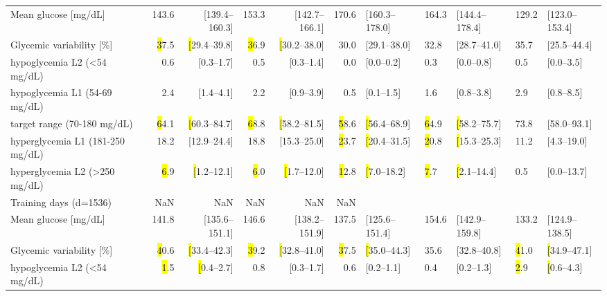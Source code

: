 \begin{tabular}{lrrrrr}
Mean glucose [mg/dL]                         &     143.6 & [139.4--160.3] &     153.3 & [142.7--166.1] &     170.6 & [160.3--178.0] &     164.3 & [144.4--178.4] &     129.2 & [123.0--153.4] \\
Glycemic variability [\%]                    &  \hl37.5 & \hl[29.4--39.8] &  \hl36.9 & \hl[30.2--38.0] &        30.0 & [29.1--38.0] &        32.8 & [28.7--41.0] &        35.7 & [25.5--44.4] \\
\hspace{7mm}hypoglycemia L2 (<54 mg/dL)      &           0.6 & [0.3--1.7] &           0.5 & [0.3--1.4] &           0.0 & [0.0--0.2] &           0.3 & [0.0--0.8] &           0.5 & [0.0--3.5] \\
\hspace{7mm}hypoglycemia L1 (54-69 mg/dL)    &           2.4 & [1.4--4.1] &           2.2 & [0.9--3.9] &           0.5 & [0.1--1.5] &           1.6 & [0.8--3.8] &           2.9 & [0.8--8.5] \\
\hspace{7mm}target range (70-180 mg/dL)      &  \hl64.1 & \hl[60.3--84.7] &  \hl68.8 & \hl[58.2--81.5] &  \hl58.6 & \hl[56.4--68.9] &  \hl64.9 & \hl[58.2--75.7] &        73.8 & [58.0--93.1] \\
\hspace{7mm}hyperglycemia L1 (181-250 mg/dL) &        18.2 & [12.9--24.4] &        18.8 & [15.3--25.0] &  \hl23.7 & \hl[20.4--31.5] &  \hl20.8 & \hl[15.3--25.3] &         11.2 & [4.3--19.0] \\
\hspace{7mm}hyperglycemia L2 (>250 mg/dL)    &    \hl6.9 & \hl[1.2--12.1] &    \hl6.0 & \hl[1.7--12.0] &   \hl12.8 & \hl[7.0--18.2] &    \hl7.7 & \hl[2.1--14.4] &          0.5 & [0.0--13.7] \\
Training days (d=1536)                       &                        NaN &                        NaN &                        NaN &                        NaN &                        NaN \\
Mean glucose [mg/dL]                         &     141.8 & [135.6--151.1] &     146.6 & [138.2--151.9] &     137.5 & [125.6--151.4] &     154.6 & [142.9--159.8] &     133.2 & [124.9--138.5] \\
Glycemic variability [\%]                    &  \hl40.6 & \hl[33.4--42.3] &  \hl39.2 & \hl[32.8--41.0] &  \hl37.5 & \hl[35.0--44.3] &        35.6 & [32.8--40.8] &  \hl41.0 & \hl[34.9--47.1] \\
\hspace{7mm}hypoglycemia L2 (<54 mg/dL)      &     \hl1.5 & \hl[0.4--2.7] &           0.8 & [0.3--1.7] &           0.6 & [0.2--1.1] &           0.4 & [0.2--1.3] &     \hl2.9 & \hl[0.6--4.3] \\

\end{tabular}
